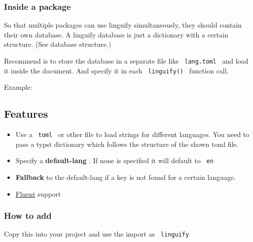 \subsubsection{Inside a package}\label{inside-a-package}

So that multiple packages can use linguify simultaneously, they should
contain their own database. A linguify database is just a dictionary
with a certain structure. (See database structure.)

Recommend is to store the database in a separate file like
\texttt{\ lang.toml\ } and load it inside the document. And specify it
in each \texttt{\ linguify()\ } function call.

Example:

\begin{Shaded}
\begin{Highlighting}[]


\end{Highlighting}
\end{Shaded}

\subsection{Features}\label{features}

\begin{itemize}
\tightlist
\item
  Use a \texttt{\ toml\ } or other file to load strings for different
  languages. You need to pass a typst dictionary which follows the
  structure of the shown toml file.
\item
  Specify a \textbf{default-lang} . If none is specified it will default
  to \texttt{\ en\ }
\item
  \textbf{Fallback} to the default-lang if a key is not found for a
  certain language.
\item
  \href{https://projectfluent.org/}{Fluent} support
\end{itemize}

\subsubsection{How to add}\label{how-to-add}

Copy this into your project and use the import as \texttt{\ linguify\ }

